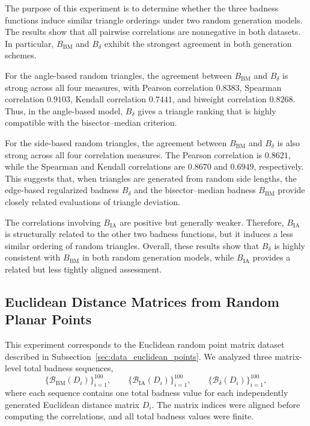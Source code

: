 \documentclass[11pt]{article}
\begin{document}
The purpose of this experiment is to determine whether the three badness functions induce similar triangle orderings under two random generation models. The results show that all pairwise correlations are nonnegative in both datasets. In particular, \(B_{\mathrm{BM}}\) and \(B_{\delta}\) exhibit the strongest agreement in both generation schemes.

For the angle-based random triangles, the agreement between \(B_{\mathrm{BM}}\) and \(B_{\delta}\) is strong across all four measures, with Pearson correlation \(0.8383\), Spearman correlation \(0.9103\), Kendall correlation \(0.7441\), and biweight correlation \(0.8268\). Thus, in the angle-based model, \(B_{\delta}\) gives a triangle ranking that is highly compatible with the bisector--median criterion.

For the side-based random triangles, the agreement between \(B_{\mathrm{BM}}\) and \(B_{\delta}\) is also strong across all four correlation measures. The Pearson correlation is \(0.8621\), while the Spearman and Kendall correlations are \(0.8670\) and \(0.6949\), respectively. This suggests that, when triangles are generated from random side lengths, the edge-based regularized badness \(B_{\delta}\) and the bisector--median badness \(B_{\mathrm{BM}}\) provide closely related evaluations of triangle deviation.

The correlations involving \(B_{\mathrm{IA}}\) are positive but generally weaker. Therefore, \(B_{\mathrm{IA}}\) is structurally related to the other two badness functions, but it induces a less similar ordering of random triangles. Overall, these results show that \(B_{\delta}\) is highly consistent with \(B_{\mathrm{BM}}\) in both random generation models, while \(B_{\mathrm{IA}}\) provides a related but less tightly aligned assessment.

\subsection{Euclidean Distance Matrices from Random Planar Points}
\label{sec:euclidean_random_points_correlation}

This experiment corresponds to the Euclidean random point matrix dataset described in Subsection~\ref{sec:data_euclidean_points}. We analyzed three matrix-level total badness sequences,
\[
\{\mathcal{B}_{\mathrm{BM}}(D_i)\}_{i=1}^{100},\qquad
\{\mathcal{B}_{\mathrm{IA}}(D_i)\}_{i=1}^{100},\qquad
\{\mathcal{B}_{\delta}(D_i)\}_{i=1}^{100},
\]
where each sequence contains one total badness value for each independently generated Euclidean distance matrix \(D_i\). The matrix indices were aligned before computing the correlations, and all total badness values were finite.
\end{document}
